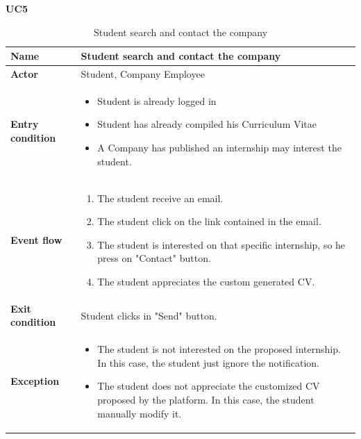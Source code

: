     \textbf{UC5}
    \begin{table}[H]
    \centering
    \begin{tabular}{|l|p{11.9cm}|}
        \hline
        \textbf{Name}            & Student search and contact the company \\\hline
        \textbf{Actor}           & Student, Company Employee         \\\hline
        \textbf{Entry condition} &
        \begin{itemize}
              \item Student is already logged in
              \item Student has already compiled his Curriculum Vitae
              \item A Company has published an internship may interest the student.
        \end{itemize}                                        \\\hline
        \textbf{Event flow}      &
        \begin{enumerate}[label=\arabic*.]
              \item The student receive an email.
              \item The student click on the link contained in the email.
              \item The student is interested on that specific internship, so he press on "Contact" button.
              \item The student appreciates the custom generated CV.
        \end{enumerate}            \\\hline
        \textbf{Exit condition}  & Student clicks in "Send" button.\\\hline
        \textbf{Exception}       &  
        \begin{itemize}
            \item The student is not interested on the proposed internship. In this case, the student just ignore the notification.
            \item The student does not appreciate the customized CV proposed by the platform. In this case, the student manually modify it.
        \end{itemize} 
        \\\hline
    \end{tabular}
    \caption{Student search and contact the company}
    \label{table:Student search and contact the company}
    \end{table}

